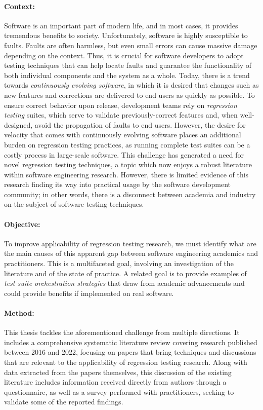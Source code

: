 \documentclass[11pt, a4paper, twoside]{Thesis} %
\begin{document}
\paragraph{Context:} 
Software is an important part of modern life, and in most cases, it provides tremendous benefits to society.
Unfortunately, software is highly susceptible to faults.
Faults are often harmless, but even small errors can cause massive damage depending on the context.
Thus, it is crucial for software developers to adopt testing techniques that can help locate faults and guarantee the functionality of both individual components and the system as a whole.
Today, there is a trend towards \textit{continuously evolving software}, in which it is desired that changes such as new features and corrections are delivered to end users as quickly as possible.
To ensure correct behavior upon release, development teams rely on \textit{regression testing} suites, which serve to validate previously-correct features and, when well-designed, avoid the propagation of faults to end users.
However, the desire for velocity that comes with continuously evolving software places an additional burden on regression testing practices, as running complete test suites can be a costly process in large-scale software.
This challenge has generated a need for novel regression testing techniques, a topic which now enjoys a robust literature within software engineering research.
However, there is limited evidence of this research finding its way into practical usage by the software development community; in other words, there is a disconnect between academia and industry on the subject of software testing techniques.

\paragraph{Objective:} 
To improve applicability of regression testing research, we must identify what are the main causes of this apparent gap between software engineering academics and practitioners.
This is a multifaceted goal, involving an investigation of the literature and of the state of practice.
A related goal is to provide examples of \textit{test suite orchestration strategies} that draw from academic advancements and could provide benefits if implemented on real software.

\paragraph{Method:}
This thesis tackles the aforementioned challenge from multiple directions.
It includes a comprehensive systematic literature review covering research published between 2016 and 2022, focusing on papers that bring techniques and discussions that are relevant to the applicability of regression testing research.
Along with data extracted from the papers themselves, this discussion of the existing literature includes information received directly from authors through a questionnaire, as well as a survey performed with practitioners, seeking to validate some of the reported findings.
\end{document}
